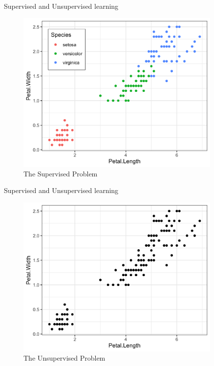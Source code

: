 \documentclass[10pt]{beamer}
\begin{document}
\begin{frame}{Supervised and Unsupervised learning}

\begin{figure}[h]
\centering
\includegraphics[width=0.9\textwidth]{fig/iris_supervised.png}
\caption{The Supervised Problem}
\end{figure}

\end{frame}

\begin{frame}{Supervised and Unsupervised learning}

\begin{figure}[h]
\centering
\includegraphics[width=0.9\textwidth]{fig/iris_unsupervised.png}
\caption{The Unsupervised Problem}
\end{figure}

\end{frame}
\end{document}
